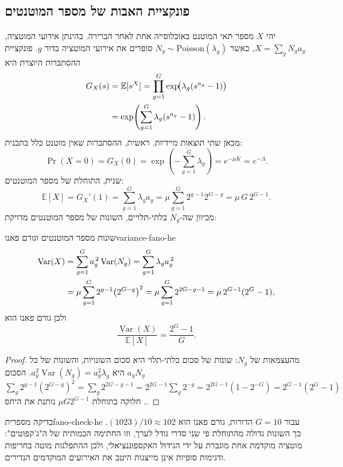 \subsection*{פונקציית האבות של מספר המוטנטים}
יהי \(X\) מספר תאי המוטנט באוכלוסייה אחת לאחר הברירה. בהינתן אירועי המוטציה, \(X=\sum_{g}N_ga_g\), כאשר \(N_g\sim\text{Poisson}(\lambda_g)\) סופרים את אירועי המוטציה בדור \(g\). פונקציית ההסתברות היוצרת היא
\begin{align}
G_X(s)&=\mathbb{E}[s^{X}]
       =\prod_{g=1}^{G}\exp\!\bigl(\lambda_g(s^{a_g}-1)\bigr) \notag\\
      &=\exp\!\left(\sum_{g=1}^{G}\lambda_g(s^{a_g}-1)\right).
\label{eq:he-bio-gf}
\end{align}
מכאן שתי תוצאות מיידיות. ראשית, ההסתברות שאין מוטנט כלל בתבנית:
\begin{equation}\label{eq:he-bio-p0}
\Pr(X=0)=G_X(0)=\exp\!\left(-\sum_{g=1}^{G}\lambda_g\right)=e^{-\mu K}=e^{-\Lambda}.
\end{equation}
שנית, התוחלת של מספר המוטנטים:
\begin{equation}\label{eq:he-bio-mean}
\mathbb{E}[X]=G_X'(1)=\sum_{g=1}^{G}\lambda_g a_g
              =\mu\sum_{g=1}^{G}2^{g-1}2^{G-g}
              =\mu\,G\,2^{G-1}.
\end{equation}
מכיוון שה-\(N_g\) בלתי-תלויים, השונות של מספר המוטנטים מדויקת:
\begin{theorem}{שונות מספר המוטנטים וגורם פאנו}{variance-fano-he}
\begin{align}
\operatorname{Var}(X)
&=\sum_{g=1}^{G}a_g^{\,2}\operatorname{Var}(N_g)
 =\sum_{g=1}^{G}\lambda_g a_g^{\,2} \notag\\
&=\mu\sum_{g=1}^{G}2^{g-1}\bigl(2^{G-g}\bigr)^2
 =\mu\sum_{g=1}^{G}2^{2G-g-1}
 =\mu\,2^{G-1}(2^{G}-1),
\label{eq:he-bio-variance}
\end{align}
ולכן גורם פאנו הוא
\begin{equation}\label{eq:he-bio-var-ratio}
\boxed{\frac{\operatorname{Var}(X)}{\mathbb{E}[X]}=\frac{2^{G}-1}{G}} .
\end{equation}
\end{theorem}
\begin{proof}
מהעצמאות של \(N_g\): שונות של סכום בלתי-תלוי היא סכום השונויות, והשונות של כל \(a_gN_g\) היא \(a_g^2\operatorname{Var}(N_g) = a_g^2\lambda_g\). הסכום \(\sum_{g}2^{g-1}(2^{G-g})^2 = \sum_g 2^{2G-g-1} = 2^{2G-1}\sum_g 2^{-g} = 2^{2G-1}(1 - 2^{-G}) = 2^{G-1}(2^G-1)\). חלוקה בתוחלת \(\mu G 2^{G-1}\) נותנת את היחס.
\end{proof}
\begin{example}{בדיקה מספרית}{fano-check-he}
עבור \(G=10\) הדורות, גורם פאנו הוא \((1023)/10 \approx 102\). כך השונות גדולה מהתוחלת פי שני סדרי גודל לערך, וזו החתימה הכמותית של ה"ג'קפוטים": מוטציה מוקדמת אחת מוגברת על ידי הגידול האקספוננציאלי, ולכן ההתפלגות מוטה בחריפות ודגימות סופיות אינן מייצגות היטב את האירועים המוקדמים הנדירים.
\end{example}
